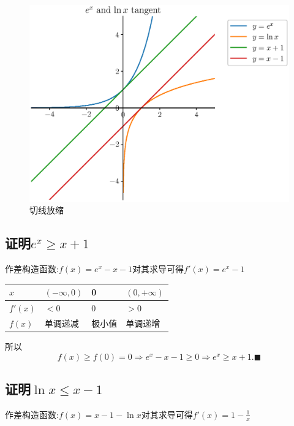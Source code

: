 \documentclass{book}
\begin{document}
    \begin{figure}[htbp] 
        \centering
        \includegraphics[width=\textwidth]{img/LogExFunction.eps}
        \caption{切线放缩}
    \end{figure}

    \subsection{证明$e^x\ge x+1$}

    \textcolor[rgb]{0.75,0.17,0.22}{作差构造函数}:$f(x)=e^x-x-1$对其求导可得$f'(x)=e^x-1$

    \begin{table}[htbp]
        \centering
        \begin{tabular}{|l|l|l|l|}
        \hline
        $x$     & $(-\infty,0)$ & 0   & $(0,+\infty)$ \\ \hline
        $f'(x)$ & $<0$          & 0   & $>0$          \\ \hline
        $f(x)$  & 单调递减          & 极小值 & 单调递增          \\ \hline
        \end{tabular}
    \end{table}
    所以$$f(x)\ge f(0)=0\Longrightarrow e^x-x-1\ge 0\Longrightarrow e^x\ge x+1.\blacksquare$$

    \subsection{证明$\ln x\le x-1$}

    \textcolor[rgb]{0.75,0.17,0.22}{作差构造函数}:$f(x)=x-1-\ln x$对其求导可得$\displaystyle f'(x)=1-\frac{1}{x}$
\end{document}
